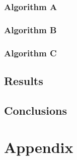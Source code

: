 \subsubsection{Algorithm A}
\label{sec:alg3A}



\subsubsection{Algorithm B}
\label{sec:alg3B}

\subsubsection{Algorithm C}
\label{sec:alg3C}
\subsection{Results}
\label{sec:res3}


\subsection{Conclusions}
\label{sec:conc3}


\newpage
\appendix

\section{Appendix}
\label{sec:appendix}
